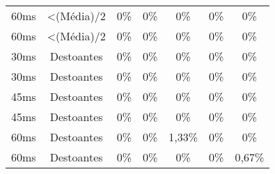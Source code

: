 \begin{table}[]
\begin{tabular}{|c|c|ccccc|}
60ms              & \textless (Média)/2 & 0\%            & 0\%            & 0\%            & 0\%            & 0\%            \\
60ms              & \textless (Média)/2 & 0\%            & 0\%            & 0\%            & 0\%            & 0\%            \\ \hline
30ms              & Destoantes          & 0\%            & 0\%            & 0\%            & 0\%            & 0\%            \\
30ms              & Destoantes          & 0\%            & 0\%            & 0\%            & 0\%            & 0\%            \\
45ms              & Destoantes          & 0\%            & 0\%            & 0\%            & 0\%            & 0\%            \\
45ms              & Destoantes          & 0\%            & 0\%            & 0\%            & 0\%            & 0\%            \\
60ms              & Destoantes          & 0\%            & 0\%            & 1,33\%            & 0\%            & 0\%            \\
60ms              & Destoantes          & 0\%            & 0\%            & 0\%            & 0\%            & 0,67\%            \\ \hline
\end{tabular}
\end{table}
